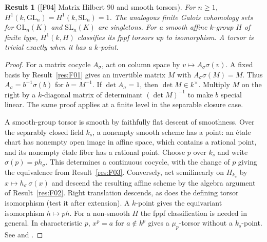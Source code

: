 \documentclass[11pt,a4paper,openany,oneside]{book}
\theoremstyle{resultstyle}
\newtheorem{statement}{Result}[chapter]
\newenvironment{result}[2]{\clubpenalty=10000\begin{statement}[\textnormal{[#1]} #2]\leavevmode\label{res:#1}\ignorespaces}{\end{statement}}
\theoremstyle{definition}
\numberwithin{equation}{chapter}
\newcommand{\GL}{\mathrm{GL}}
\newcommand{\SL}{\mathrm{SL}}
\begin{document}
\begin{result}{F04}{Matrix Hilbert 90 and smooth torsors}
For $n\geq 1$, $H^1(k,\GL_n)=H^1(k,\SL_n)=1$. The analogous finite Galois cohomology sets for $\GL_n(K)$ and $\SL_n(K)$ are singletons. For a smooth affine $k$-group $H$ of finite type, $H^1(k,H)$ classifies its fppf torsors up to isomorphism. A torsor is trivial exactly when it has a $k$-point.
\end{result}
\begin{proof}
For a matrix cocycle $A_\sigma$, act on column space by $v\mapsto A_\sigma\sigma(v)$. A fixed basis by Result~\ref{res:F01} gives an invertible matrix $M$ with $A_\sigma\sigma(M)=M$. Thus $A_\sigma=b^{-1}\sigma(b)$ for $b=M^{-1}$. If $\det A_\sigma=1$, then $\det M\in k^\times$. Multiply $M$ on the right by a $k$-diagonal matrix of determinant $(\det M)^{-1}$ to make $b$ special linear. The same proof applies at a finite level in the separable closure case.

A smooth-group torsor is smooth by faithfully flat descent of smoothness. Over the separably closed field $k_s$, a nonempty smooth scheme has a point: an étale chart has nonempty open image in affine space, which contains a rational point, and its nonempty étale fiber has a rational point. Choose $p$ over $k_s$ and write $\sigma(p)=p h_\sigma$. This determines a continuous cocycle, with the change of $p$ giving the equivalence from Result~\ref{res:F03}. Conversely, act semilinearly on $H_{k_s}$ by $x\mapsto h_\sigma\,\sigma(x)$ and descend the resulting affine scheme by the algebra argument of Result~\ref{res:F02}. Right translation descends, as does the defining torsor isomorphism (test it after extension). A $k$-point gives the equivariant isomorphism $h\mapsto ph$. For a non-smooth $H$ the fppf classification is needed in general. In characteristic $p$, $x^p=a$ for $a\notin k^p$ gives a $\mu_p$-torsor without a $k_s$-point. See \cite[Example 2.3.4]{gs} and \cite[Secs.~3.38--3.40, 3.46--3.50]{milne}.
\end{proof}
\end{document}
